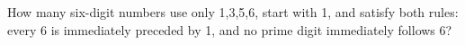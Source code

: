 How many six-digit numbers use only 1,3,5,6, start with 1, and satisfy both rules: every 6 is immediately preceded by 1, and no prime digit immediately follows 6?
